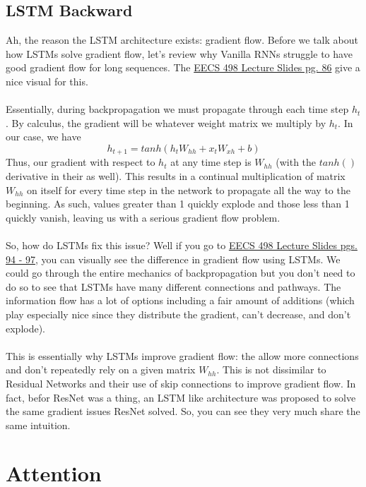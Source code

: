 \documentclass[12pt]{article}
\begin{document}
\subsection{LSTM Backward}
Ah, the reason the LSTM architecture exists: gradient flow. Before we talk about how LSTMs 
solve gradient flow, let's review why Vanilla RNNs struggle to have good gradient flow for 
long sequences. The \href{https://web.eecs.umich.edu/~justincj/slides/eecs498/498_FA2019_lecture12.pdf}
{EECS 498 Lecture Slides pg. 86} give a nice visual for this. 
~\\
~\\
Essentially, during backpropagation we must propagate through each time step $h_t$. By calculus, 
the gradient will be whatever weight matrix we multiply by $h_t$. In our case, we have 
\begin{equation*}
    h_{t+1} = tanh(h_{t}W_{hh} + x_tW_{xh} + b)
\end{equation*}
Thus, our gradient with respect to $h_t$ at any time step is $W_{hh}$ (with the 
$tanh()$ derivative in their as well). This results in a continual multiplication 
of matrix $W_{hh}$ on itself for every time step in the network to propagate all 
the way to the beginning. As such, values greater than 1 quickly explode and those 
less than 1 quickly vanish, leaving us with a serious gradient flow problem. 
~\\
~\\
So, how do LSTMs fix this issue? Well if you go to \href{https://web.eecs.umich.edu/~justincj/slides/eecs498/498_FA2019_lecture12.pdf}
{EECS 498 Lecture Slides pgs. 94 - 97}, you can visually see the difference in gradient 
flow using LSTMs. We could go through the entire mechanics of backpropagation but you don't 
need to do so to see that LSTMs have many different connections and pathways. The information 
flow has a lot of options including a fair amount of additions (which play especially nice since
they distribute the gradient, can't decrease, and don't explode). 
~\\
~\\
This is essentially why LSTMs improve gradient flow: the allow more connections and don't 
repeatedly rely on a given matrix $W_{hh}$. This is not dissimilar to Residual Networks and 
their use of skip connections to improve gradient flow. In fact, befor ResNet was a thing, 
an LSTM like architecture was proposed to solve the same gradient issues ResNet solved. So, 
you can see they very much share the same intuition. 

\section{Attention}
\end{document}
